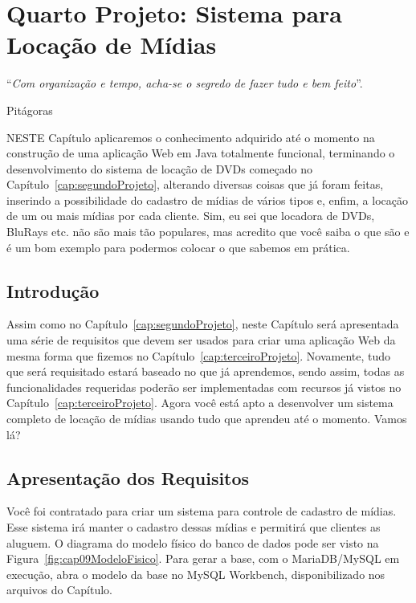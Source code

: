 \chapter{Quarto Projeto: Sistema para Locação de Mídias}\label{cap:quartoProjeto}
\epigraph{``\textit{Com organização e tempo, acha-se o segredo de fazer tudo e bem feito}''.}{Pitágoras}

\lettrine[lines=4, lhang=0.1, lraise=0, loversize=0.2, findent=0.1em]{\textcolor{corAzulTema}{N}}{ESTE} Capítulo aplicaremos o conhecimento adquirido até o momento na construção de uma aplicação Web em Java totalmente funcional, terminando o desenvolvimento do sistema de locação de DVDs começado no Capítulo~\ref{cap:segundoProjeto}, alterando diversas coisas que já foram feitas, inserindo a possibilidade do cadastro de mídias de vários tipos e, enfim, a locação de um ou mais mídias por cada cliente. Sim, eu sei que locadora de DVDs, BluRays etc. não são mais tão populares, mas acredito que você saiba o que são e é um bom exemplo para podermos colocar o que sabemos em prática.


\section{Introdução}

Assim como no Capítulo~\ref{cap:segundoProjeto}, neste Capítulo será apresentada uma série de requisitos que devem ser usados para criar uma aplicação Web da mesma forma que fizemos no Capítulo~\ref{cap:terceiroProjeto}. Novamente, tudo que será requisitado estará baseado no que já aprendemos, sendo assim, todas as funcionalidades requeridas poderão ser implementadas com recursos já vistos no Capítulo~\ref{cap:terceiroProjeto}. Agora você está apto a desenvolver um sistema completo de locação de mídias usando tudo que aprendeu até o momento. Vamos lá?


\section{Apresentação dos Requisitos}

Você foi contratado para criar um sistema para controle de cadastro de mídias. Esse sistema irá manter o cadastro dessas mídias e permitirá que clientes as aluguem. O diagrama do modelo físico do banco de dados pode ser visto na Figura~\ref{fig:cap09ModeloFisico}. Para gerar a base, com o MariaDB/MySQL em execução, abra o modelo da base no MySQL Workbench, disponibilizado nos arquivos do Capítulo.

